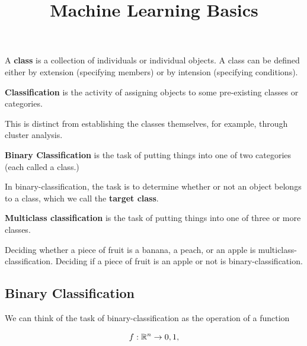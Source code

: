 \documentclass{article}
\title{Machine Learning Basics}
\begin{document}
\begin{definition}[Class]
A \textbf{class} is a collection of individuals or individual objects. A class can be defined either by extension (specifying members) or by intension (specifying conditions).
\end{definition}

\begin{definition}[Classification]
\textbf{Classification} is the activity of assigning objects to some pre-existing \@{classes} or categories.
\end{definition}

\begin{remark}
This is distinct from establishing the \@{classes} themselves, for example, through cluster analysis.
\end{remark}

\begin{definition}
\textbf{Binary Classification} is the task of putting things into one of two categories (each called a \@{class}.)
\end{definition}

\begin{definition}
In \@{binary-classification}, the task is to determine whether or not an object belongs to a \@{class}, which we call the \textbf{target class}.
\end{definition}

\begin{definition}
\textbf{Multiclass classification} is the task of putting things into one of three or more \@{classes}.
\end{definition}

\begin{remark}
Deciding whether a piece of fruit is a banana, a peach, or an apple is \@{multiclass-classification}. Deciding if a piece of fruit is an apple or not is \@{binary-classification}.
\end{remark}

\subsection{Binary Classification}

We can think of the task of \@{binary-classification} as the operation of a \@{function}

\[ f : \mathbb{R}^n \to {0,1}, \]
\end{document}
